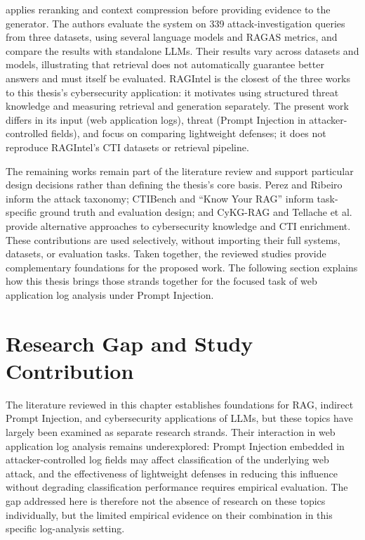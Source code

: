 \begin{enumerate}
  applies reranking and context compression before providing evidence to
  the generator. The authors evaluate the system on 339 attack-investigation
  queries from three datasets, using several language models and RAGAS
  metrics, and compare the results with standalone LLMs. Their results vary
  across datasets and models, illustrating that retrieval does not
  automatically guarantee better answers and must itself be evaluated.
  RAGIntel is the closest of the three works to this thesis's cybersecurity
  application: it motivates using structured threat knowledge and measuring
  retrieval and generation separately. The present work differs in its
  input (web application logs), threat (Prompt Injection in attacker-controlled
  fields), and focus on comparing lightweight defenses; it does not reproduce
  RAGIntel's CTI datasets or retrieval pipeline.
\end{enumerate}

The remaining works remain part of the literature review and support
particular design decisions rather than defining the thesis's core basis.
Perez and Ribeiro inform the attack taxonomy; CTIBench and ``Know Your RAG''
inform task-specific ground truth and evaluation design; and CyKG-RAG and
Tellache et al. provide alternative approaches to cybersecurity knowledge
and CTI enrichment. These contributions are used selectively, without
importing their full systems, datasets, or evaluation tasks. Taken together,
the reviewed studies provide complementary foundations for the proposed
work. The following section explains how this thesis brings those strands
together for the focused task of web application log analysis under Prompt
Injection.

\section{Research Gap and Study Contribution}\label{research-gap}

The literature reviewed in this chapter establishes foundations for RAG,
indirect Prompt Injection, and cybersecurity applications of LLMs, but
these topics have largely been examined as separate research strands. Their
interaction in web application log analysis remains underexplored:
Prompt Injection embedded in attacker-controlled log fields may affect
classification of the underlying web attack, and the effectiveness of
lightweight defenses in reducing this influence without degrading
classification performance requires empirical evaluation. The gap addressed
here is therefore not the absence of research on these topics individually,
but the limited empirical evidence on their combination in this specific
log-analysis setting.

